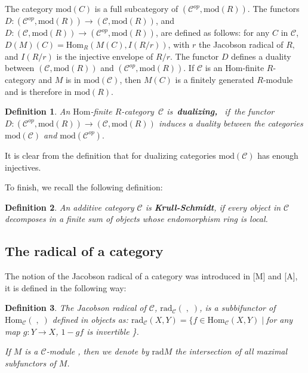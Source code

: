 \documentclass{amsart}
\theoremstyle{plain}
\newtheorem{definition}{Definition}
\numberwithin{equation}{section}
\begin{document}
The category $\mathrm{mod}(C)$ is a full subcategory of $(\mathcal{C}^{op},\mathrm{mod}(R))$. The functors $D:(\mathcal{C}^{op},\mathrm{mod}(R))\rightarrow (\mathcal{C},\mathrm{mod}(R))$, and $D:(\mathcal{C},\mathrm{mod}(R))\rightarrow (\mathcal{C}^{op},\mathrm{mod}(R))$, are defined as
follows: for any $C$ in $\mathcal{C}$, $D(M)(C)=\mathrm{Hom}_{R}(M(C),I(R/r)) $, with $r$ the Jacobson radical of $R,$ and $I(R/r)$ is
the injective envelope of $R/r.$ The functor $D$ defines a duality between $(\mathcal{C},\mathrm{mod}(R))$ and $(\mathcal{C}^{op},\mathrm{mod}(R))$. If $\mathcal{C}$ is an $\mathrm{Hom}$-finite $R$-category and $M$ is in $\mathrm{mod}(\mathcal{C})$, then $M(C)$ is a finitely generated $R$-module and is
therefore in $\mathrm{mod}(R)$.

\begin{definition}
An $\mathrm{Hom}$-finite $R$-category\ $\mathcal{C}$ is\ \textbf{dualizing,}
\ if\ the functor\ $D:(\mathcal{C}^{op},\mathrm{mod}(R))\rightarrow (\mathcal{C},\mathrm{mod}(R))$ induces a duality between the categories $\mathrm{mod}(\mathcal{C})$ and $\mathrm{mod}(\mathcal{C}^{op}).$
\end{definition}

It is clear from the definition that for dualizing categories $\mathrm{mod}(\mathcal{C})$ has enough injectives.

To finish, we recall the following definition:

\begin{definition}
An additive category $\mathcal{C}$ is \textbf{Krull-Schmidt}, if every
object in $\mathcal{C}$ decomposes in a finite sum of objects whose
endomorphism ring is local.
\end{definition}

\subsection{The radical of a category}

The notion of the Jacobson radical of a category was introduced in [M] and
[A], it is defined in the following way:

\begin{definition}
The Jacobson radical of $\mathcal{C}$, $\mathrm{rad}_{\mathcal{C}}(\;,\;)$,
is a subbifunctor of $\mathrm{Hom}_{\mathcal{C}}(\;,\;)$ defined in objects
as: $\mathrm{rad}_{\mathcal{C}}(X,Y)=\{f\in \mathrm{Hom}_{\mathcal{C}}(X,Y)\mid $for any map $g:Y\rightarrow X$, $1-gf$ is invertible \}.

If $M$ is a $\mathcal{C}$-module , then we denote by $\mathrm{rad}M$ the
intersection of all maximal subfunctors of $M$.
\end{definition}
\end{document}
